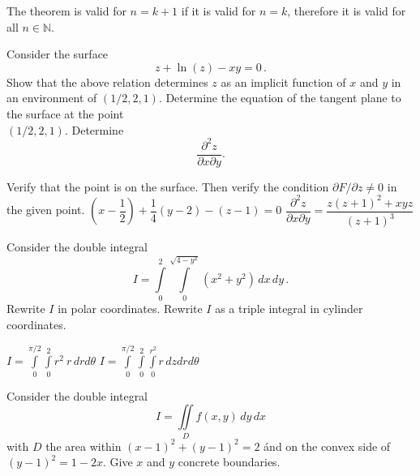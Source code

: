 \begin{Answer}
    The theorem is valid for $n=k+1$ if it is valid for $n=k$, therefore it is valid for all $n \in \mathbb{N}$.
\end{Answer}



\begin{Exercise} %
Consider the surface
\[z + \ln(z)-xy=0 \,.
\]
\Question Show that the above relation determines $z$ as an implicit function of $x$ and $y$ in an environment of $(1/2,2,1)$.
\Question Determine the equation of the tangent plane to the surface at the point \\ $(1/2,2,1)$.
\Question Determine 
\[\dfrac{\partial^2 z}{\partial x \partial y}. \]
\EndCurrentQuestion
\end{Exercise}

\begin{Answer}

\Question Verify that the point is on the surface. Then verify the condition $\partial F / \partial z \neq 0$ in the given point. 
\Question $ \left(x - \dfrac{1}{2} \right) + \dfrac{1}{4}\left(y-2 \right) - \left(z-1 \right) =0  $
\Question $\dfrac{\partial^2 z}{\partial x \partial y} = \dfrac{z(z+1)^2 + xyz }{(z+1)^3}$

\end{Answer}


\begin{Exercise} %
Consider the double integral
\[
I = \int\limits_0^2\int\limits_{0}^{\sqrt{4-y^2}}(x^2+y^2)\,dx\,dy\,.
\]
\Question Rewrite $I$ in polar coordinates. 
\Question Rewrite $I$ as a triple integral in cylinder coordinates.
\EndCurrentQuestion
\end{Exercise}

\begin{Answer}

\Question $I = \displaystyle \int \limits_0^{\pi/2} \int \limits_0^{2} r^2 \ r\, dr d \theta $ 
\Question $I = \displaystyle \int \limits_0^{\pi/2} \int \limits_0^{2} \int \limits_0^{r^2} r\,dz dr d \theta $ 

\end{Answer}



\begin{Exercise} %
Consider the double integral
\[I=\iint\limits_{D}f(x,y)\,dy\,dx \]
with $D$ the area within $(x-1)^2 + (y-1)^2 = 2$ \'and on the convex side of \\ $(y-1)^2=1-2x$. Give $x$ and $y$ concrete boundaries.
\end{Exercise}

